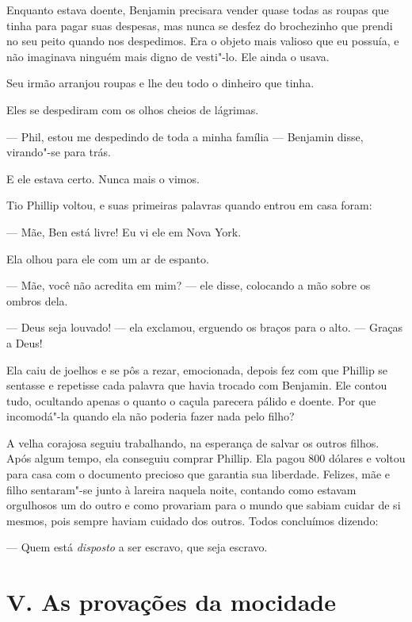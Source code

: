 Enquanto estava doente, Benjamin
precisara vender quase todas as roupas que tinha para pagar suas
despesas, mas nunca se desfez do brochezinho que prendi no seu peito
quando nos despedimos. Era o objeto mais valioso que eu possuía, e não
imaginava ninguém mais digno de vesti"-lo. Ele ainda o usava.

Seu irmão arranjou roupas e lhe deu
todo o dinheiro que tinha.

Eles se despediram com os olhos cheios
de lágrimas.

--- Phil, estou me despedindo de toda a minha família --- Benjamin
disse, virando"-se para trás.

E ele estava certo. Nunca mais o vimos.

Tio Phillip voltou, e suas primeiras
palavras quando entrou em casa foram:

--- Mãe, Ben está livre! Eu vi ele em Nova York.

Ela olhou para ele com um ar de espanto.

--- Mãe, você não acredita em mim? --- ele disse, colocando a mão sobre
os ombros dela.

--- Deus seja louvado! --- ela exclamou, erguendo os braços para o alto.
--- Graças a Deus!

Ela caiu de joelhos e se pôs a rezar, emocionada, depois fez com que
Phillip se sentasse e repetisse cada palavra que havia trocado com
Benjamin. Ele contou tudo, ocultando apenas o quanto o caçula parecera
pálido e doente. Por que incomodá"-la quando ela não poderia fazer nada
pelo filho?

A velha corajosa seguiu trabalhando, na
esperança de salvar os outros filhos. Após algum tempo, ela conseguiu
comprar Phillip. Ela pagou 800 dólares e voltou para casa com o
documento precioso que garantia sua liberdade. Felizes, mãe e filho
sentaram"-se junto à lareira naquela noite, contando como estavam
orgulhosos um do outro e como provariam para o mundo que sabiam cuidar
de si mesmos, pois sempre haviam cuidado dos outros. Todos concluímos
dizendo:

--- Quem está \emph{disposto} a ser escravo, que seja escravo.

\chapter{V. As provações da
mocidade}


